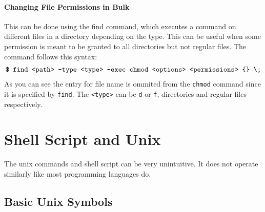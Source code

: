 \documentclass{report}
\begin{document}
       \subsubsection{Changing File Permissions in Bulk}
       This can be done using the find command, which executes a command on different files in a directory depending on the type. This can be useful when some permission is meant to be granted to all directories but not regular files. The command follows this syntax:
      \vspace{-.4cm}
       \begin{align*}
         \textnormal{\texttt{\$ find <path> -type <type> -exec chmod <options> <permissions> \{\} \textbackslash;}}
       \end{align*}
       As you can see the entry for file name is ommited from the \texttt{chmod} command since it is specified by \texttt{find}. The \texttt{<type>} can be \texttt{d} or \texttt{f}, directories and regular files respectively. 




       \chapter{Shell Script and Unix}

       The unix commands and shell script can be very unintuitive. It does not operate similarly like most programming languages do.


       \section{Basic Unix Symbols}
\end{document}
